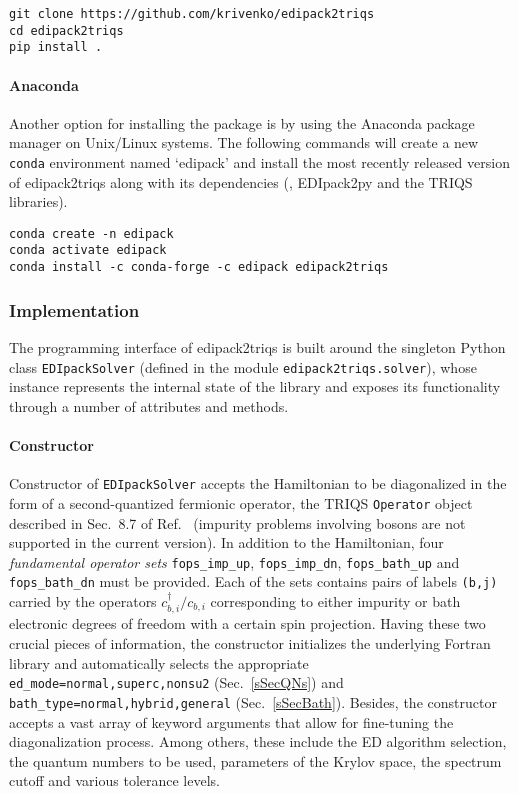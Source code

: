 \documentclass[edipack2.tex]{subfiles}
\begin{document}
\begin{lstlisting}[style=mybash]
git clone https://github.com/krivenko/edipack2triqs
cd edipack2triqs
pip install .
\end{lstlisting}

\paragraph{Anaconda}
Another option for installing the package is by using the Anaconda package 
manager on Unix/Linux systems.
The following commands will create a new {\tt conda} environment named 
`edipack' and install the most recently released version of edipack2triqs along 
with its dependencies (\NAME, EDIpack2py and the TRIQS libraries).

\begin{lstlisting}[style=mybash]
conda create -n edipack
conda activate edipack
conda install -c conda-forge -c edipack edipack2triqs
\end{lstlisting}

\subsubsection{Implementation}\label{sSecInteropTRIQSImplementation}
The programming interface of edipack2triqs is built around the singleton 
Python class {\tt EDIpackSolver} (defined in the module
{\tt edipack2triqs.solver}), whose instance represents the internal state of 
the \NAME library and exposes its functionality through a number of 
attributes and methods.

\paragraph{{\bf Constructor}}
Constructor of {\tt EDIpackSolver} accepts the Hamiltonian to be diagonalized
in the form of a second-quantized fermionic operator, the TRIQS {\tt Operator}
object described in Sec.~8.7 of Ref.~ (impurity 
problems involving bosons are not supported in the current version). In 
addition to the Hamiltonian, four {\it fundamental operator sets}
{\tt fops\_imp\_up}, {\tt fops\_imp\_dn}, {\tt fops\_bath\_up} and
{\tt fops\_bath\_dn} must be provided.
Each of the sets contains pairs of labels {\tt (b,j)} carried
by the operators $c^\dagger_{b,i} / c_{b,i}$ corresponding to either impurity
or bath electronic degrees of freedom with a certain spin projection.
Having these two crucial pieces of information, the constructor initializes
the underlying Fortran library and automatically selects the appropriate
{\tt ed\_mode=normal,superc,nonsu2} (Sec.~\ref{sSecQNs}) and
{\tt bath\_type=normal,hybrid,general} (Sec.~\ref{sSecBath}). Besides, the
constructor accepts a vast array of keyword arguments that allow for fine-tuning
the diagonalization process. Among others, these include the ED algorithm
selection, the quantum numbers to be used, parameters of the Krylov space,
the spectrum cutoff and various tolerance levels.
\end{document}
